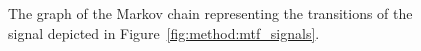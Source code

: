\begin{figure}[h!]
	\centering
	\caption{ The graph of the Markov chain representing the transitions of the signal depicted in Figure~\ref{fig:method:mtf_signals}.}
	\label{fig:method:markov_chain}
\end{figure}

